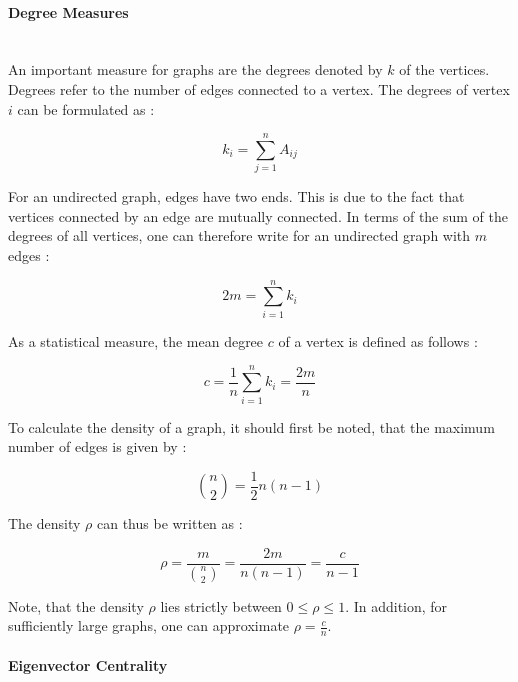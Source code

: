 	\paragraph{Degree Measures} \mbox{}\\

	\noindent An important measure for graphs are the degrees denoted by $k$ of 
	the vertices. Degrees refer to the number of edges connected to a vertex. The 
	degrees of vertex $i$ can be formulated as \citep[p. 133]{Newman2010}:

	\begin{equation}
		k_i = \sum_{j=1}^{n} A_{ij}
	\end{equation}

	\noindent For an undirected graph, edges have two ends. This is due to the 
	fact that vertices connected by an edge are mutually connected. In terms of 
	the sum of the degrees of all vertices, one can therefore write for an
	undirected graph with $m$ edges \citep[p. 133]{Newman2010}:

	\begin{equation}
		2m = \sum_{i=1}^{n} k_i	
	\end{equation}

	\noindent As a statistical measure, the mean degree $c$ of a vertex is 
	defined as follows \citep[p. 134]{Newman2010}:

	\begin{equation}
		c = \frac{1}{n}\sum_{i=1}^{n}k_i = \frac{2m}{n}
	\end{equation}

	\noindent To calculate the density of a graph, it should first be noted, 
	that the maximum number of edges is given by \citep[p. 134]{Newman2010}:

	\begin{equation}
		{n \choose 2} = \frac{1}{2}n(n-1)
	\end{equation}

	\noindent The density $\rho$ can thus be written as \citep[p. 134]{Newman2010}:

	\begin{equation}
		\rho = \frac{m}{{n \choose 2}} = \frac{2m}{n(n-1)} = \frac{c}{n-1}
	\end{equation}

	\noindent Note, that the density $\rho$ lies strictly between 
	$0 \leqslant \rho \leqslant 1$. In addition, for sufficiently large graphs,
	one can approximate $\rho = \frac{c}{n}$. 

	\paragraph{Eigenvector Centrality} \mbox{}\\

